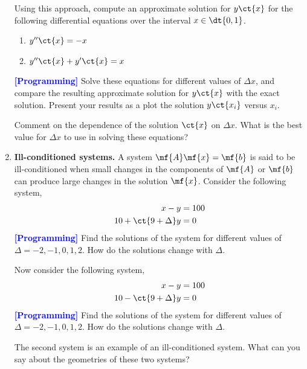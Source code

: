 \begin{enumerate}
    Using this approach, compute an approximate solution for $y\ct{x}$ for the following differential equations over the interval $x \in \dt{0, 1}$.
    \begin{enumerate}
            \item $y''\ct{x} = -x$
            \item $y''\ct{x} + y'\ct{x} = x$
    \end{enumerate}
    \textcolor{blue}{\textbf{[Programming]}} Solve these equations for different values of $\Delta x$, and compare the resulting approximate solution for $y\ct{x}$ with the exact solution.   Present your results as a plot the solution $y\ct{x_i}$ versus $x_i$. 

    Comment on the dependence of the solution $\ct{x}$ on $\Delta x$. What is the best value for $\Delta x$ to use in solving these equations? 
    
    \item \textbf{Ill-conditioned systems.} A system $\mf{A}\mf{x} = \mf{b}$ is said to be ill-conditioned when small changes in the components of $\mf{A}$ or $\mf{b}$ can produce large changes in the solution $\mf{x}$. Consider the following system,
    \begin{align}
    x - y &= 100 \nonumber \\
    10 + \ct{9 + \Delta}y &= 0 \nonumber
    \end{align}
    \textcolor{blue}{\textbf{[Programming]}} Find the solutions of the system for different values of $\Delta = -2, -1, 0, 1, 2$. How do the solutions change with $\Delta$. 

    Now consider the following system,
    \begin{align}
    x - y &= 100 \nonumber \\
    10 - \ct{9 + \Delta}y &= 0 \nonumber
    \end{align}
    \textcolor{blue}{\textbf{[Programming]}} Find the solutions of the system for different values of $\Delta = -2, -1, 0, 1, 2$. How do the solutions change with $\Delta$. 
    
    The second system is an example of an ill-conditioned system. What can you say about the geometries of these two systems? 
    

\end{enumerate}
